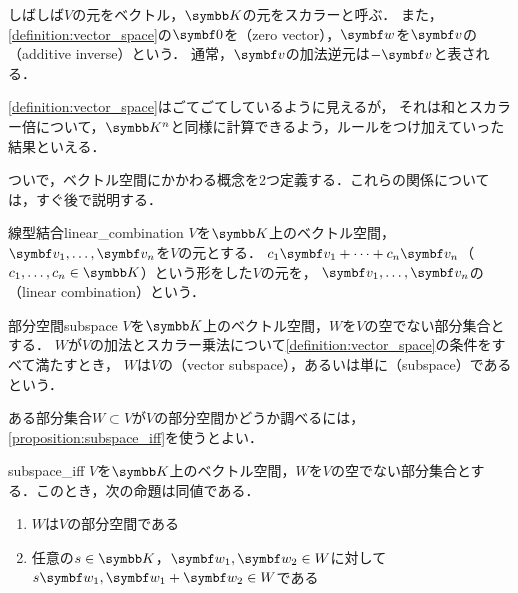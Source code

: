 \documentclass[../../main]{subfiles}
\begin{document}
しばしば\(V\)の元をベクトル，\(\numset{K}\)の元をスカラーと呼ぶ．
また，\cref{definition:vector_space}の\(\zvec\)を（zero vector），\(\vect{w}\)を\(\vect{v}\)の（additive inverse）という．
通常，\(\vect{v}\)の加法逆元は\(-\vect{v}\)と表される．

\begin{note}
  \cref{definition:vector_space}はごてごてしているように見えるが，
  それは和とスカラー倍について，\(\numset{K}^n\)と同様に計算できるよう，ルールをつけ加えていった結果といえる．
\end{note}

ついで，ベクトル空間にかかわる概念を2つ定義する．これらの関係については，すぐ後で説明する．

\begin{definition}{線型結合}{linear_combination}
  \(V\)を\(\numset{K}\)上のベクトル空間，\(\vect{v}_1,\dots,\vect{v}_n\)を\(V\)の元とする．
  \(c_1\vect{v}_1+\dots+c_n\vect{v}_n\)（\(c_1,\dots,c_n\in\numset{K}\)）という形をした\(V\)の元を，
  \(\vect{v}_1,\dots,\vect{v}_n\)の（linear combination）という．
\end{definition}

\begin{definition}{部分空間}{subspace}
  \(V\)を\(\numset{K}\)上のベクトル空間，\(W\)を\(V\)の空でない部分集合とする．
  \(W\)が\(V\)の加法とスカラー乗法について\cref{definition:vector_space}の条件をすべて満たすとき，
  \(W\)は\(V\)の（vector subspace），あるいは単に（subspace）であるという．    
\end{definition}

ある部分集合\(W\subset V\)が\(V\)の部分空間かどうか調べるには，\cref{proposition:subspace_iff}を使うとよい．

\begin{proposition}{}{subspace_iff}
  \(V\)を\(\numset{K}\)上のベクトル空間，\(W\)を\(V\)の空でない部分集合とする．このとき，次の命題は同値である．
  \begin{enumerate}
    \item \(W\)は\(V\)の部分空間である
    \item 任意の\(s\in\numset{K}\)，\(\vect{w}_1,\vect{w}_2\in W\)に対して\(s\vect{w}_1,\vect{w}_1+\vect{w}_2\in W\)である
  \end{enumerate}
\end{proposition}
\end{document}
